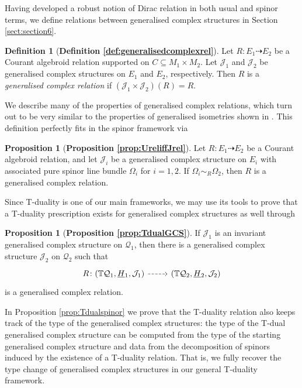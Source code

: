 \documentclass[a4paper, reqno, 11pt]{amsart}
\numberwithin{equation}{section}
\theoremstyle{definition}
\newtheorem{definition}[equation]{Definition}
\newtheorem{proposition}[equation]{Proposition}
\newcommand{\red}[1]{\underline{#1}}
\newcommand{\IT}{\mathbb{T}}
\newcommand{\cQ}{{\mathcal Q}}
\newcommand{\cJ}{{\mathcal J}}
\newcommand{\rel}{\dashrightarrow}
\theoremstyle{remark}
\begin{document}
Having developed a robust notion of Dirac relation in both usual and spinor terms, we define relations between generalised complex structures in {Section \ref{sect:section6}}.

\begin{definition}[\textbf{Definition \ref{def:generalisedcomplexrel}}]
   Let $R \colon E_1 \dashrightarrow E_2$ be a Courant algebroid relation supported on $C \subseteq M_1 \times M_2$. Let $\cJ_1$ and $\cJ_2$ be generalised complex structures on $E_1$ and  $E_2$, respectively. 
Then $R$ is a \emph{generalised complex relation} if $(\cJ_1\times\cJ_2)(R) = R$. 
\end{definition}

We describe many of the properties of generalised complex relations, which turn out to be very similar to the properties of generalised isometries shown in \cite{DeFraja:2023fhe}.
This definition perfectly fits in the spinor framework via

\begin{proposition}[\textbf{Proposition \ref{prop:UreliffJrel}}]
    Let $R\colon E_1 \rel E_2$ be a Courant algebroid relation, and let $\cJ_i$ be a generalised  complex structure on $E_i$ with associated pure spinor line bundle $\Omega_i$ for $i=1,2$. If  $\Omega_i\sim_{R} \Omega_2$, then $R$ is a generalised  complex relation.
\end{proposition}

Since T-duality is one of our main frameworks, we may use its tools to prove that a T-duality prescription exists for generalised complex structures as well through

\begin{proposition}[\textbf{Proposition \ref{prop:TdualGCS}}]
    If $\cJ_1$ is an invariant generalised complex structure on $\cQ_1$, then there is a generalised complex structure $\cJ_2$ on $\cQ_2$ such that 
    \begin{equation}
    \begin{tikzcd}
    R\colon(\IT \cQ_1, \red H{}_1, \cJ_1) \ar[r,dashed] & (\IT \cQ_2, \red H{}_2, \cJ_2)
    \end{tikzcd}
    \end{equation}
    is a generalised complex relation.
\end{proposition}

In Proposition \ref{prop:Tdualspinor} we prove that the T-duality relation also keeps track of the type of the generalised complex structures: the type of the T-dual generalised complex structure can be computed from the type of the starting generalised complex structure and data from the decomposition of spinors induced by the existence of a T-duality relation. That is, we fully recover the type change of generalised complex structures in our general T-duality framework.
\end{document}
